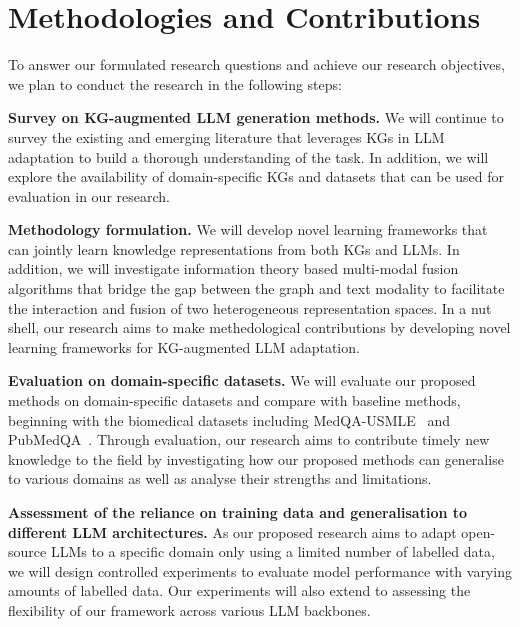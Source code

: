 \section*{Methodologies and Contributions}

To answer our formulated research questions and achieve our research objectives, we plan to conduct the research in the following steps:

\textbf{Survey on KG-augmented LLM generation methods. } 
We will continue to survey the existing and emerging literature that leverages KGs in LLM adaptation to build a thorough understanding of the task. 
In addition, we will explore the availability of domain-specific KGs and datasets that can be used for evaluation in our research.

\textbf{Methodology formulation.}
We will develop novel learning frameworks that can jointly learn knowledge representations from both KGs and LLMs.
In addition, we will investigate information theory based multi-modal fusion algorithms that bridge the gap between the graph and text modality to facilitate the interaction and fusion of two heterogeneous representation spaces. 
In a nut shell, our research aims to make methedological contributions by developing novel learning frameworks for KG-augmented LLM adaptation. 

\textbf{Evaluation on domain-specific datasets. } 
We will evaluate our proposed methods on domain-specific datasets and compare with baseline methods, beginning with the biomedical datasets including MedQA-USMLE~\parencite{medqa} and PubMedQA~\parencite{pubmedqa}.
Through evaluation, our research aims to contribute timely new knowledge to the field by investigating how our proposed methods can generalise to various domains as well as analyse their strengths and limitations. 

\textbf{Assessment of the reliance on training data and generalisation to different LLM architectures. }
As our proposed research aims to adapt open-source LLMs to a specific domain only using a limited number of labelled data, we will design controlled experiments to evaluate model performance with varying amounts of labelled data. Our experiments will also extend to assessing the flexibility of our framework across various LLM backbones.


